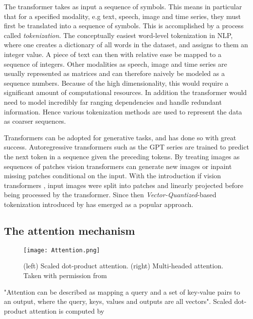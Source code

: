 \documentclass[../../thesis.tex]{subfiles}
\begin{document}
The transformer takes as input a sequence of symbols. This means in particular that for a specified modality, e.g text, speech, image and time series, they must first be translated into a sequence of symbols. This is accomplished by a process called \textit{tokenization}. The conceptually easiest word-level tokenization in NLP, where one creates a dictionary of all words in the dataset, and assigns to them an integer value. A piece of text can then with relative ease be mapped to a sequence of integers. Other modalities as speech, image and time series are usually represented as matrices and can therefore naively be modeled as a sequence numbers. Because of the high dimensionality, this would require a significant amount of computational resources. In addition the transformer would need to model incredibly far ranging dependencies and handle redundant information. Hence various tokenization methods are used to represent the data as coarser sequences. \newline

Transformers can be adopted for generative tasks, and has done so with great success. Autoregressive transformers such as the GPT series are trained to predict the next token in a sequence given the preceding tokens. By treating images as sequences of patches vision transformers can generate new images or inpaint missing patches conditional on the input. With the introduction if vision transformers \cite{dosovitskiy2021image}, input images were split into patches and linearly projected before being processed by the transformer. Since then \textit{Vector-Quantized}-based tokenization introduced by \cite{VQVAE} has emerged as a popular approach.

\subsection{The attention mechanism}

\begin{figure}[h]
    \texttt{[image: Attention.png]}
    \centering 
    \label{fig:attention}
    \caption{(left) Scaled dot-product attention. (right) Multi-headed attention. Taken with permission from \cite{vaswani2023attention}}
\end{figure}

"Attention can be described as mapping a query and a set of key-value pairs to an output, where the query, keys, values and outputs are all vectors". Scaled dot-product attention is computed by 
\end{document}
